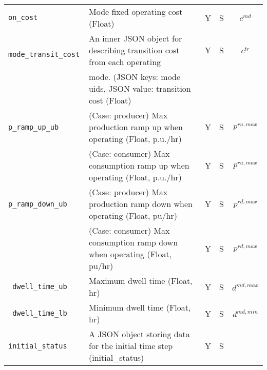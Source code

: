 \documentclass{article}
\begin{document}
\begin{center}
\begin{tabular}{ l | l | c | c | c |}
  {\tt on\_cost} & Mode fixed operating cost (Float) & Y & S & $c^{md}$\\
  {\tt\color{red} mode\_transit\_cost} & An inner JSON object for describing transition cost from each operating  & Y & S & $c^{tr}$ \\
     & mode. (JSON keys: mode uids, JSON value: transition cost (Float) &  &  &  \\
  {\tt p\_ramp\_up\_ub}     & {(Case: producer) Max production ramp up when operating (Float, p.u./hr)} & Y & S & $p^{ru,max}$ \\
                            & {(Case: consumer) Max consumption ramp up when operating (Float, p.u./hr)} & Y & S & $p^{ru,max}$ \\
  {\tt p\_ramp\_down\_ub}   & {(Case: producer) Max production ramp down when operating (Float, pu/hr)} & Y & S & $p^{rd,max}$ \\
                            & {(Case: consumer) Max consumption ramp down when operating (Float, pu/hr)} & Y & S & $p^{rd,max}$ \\
  {\tt\color{red} dwell\_time\_ub}          & Maximum dwell time (Float, hr) & Y & S &  $d^{md,max}$\\
  {\tt\color{red} dwell\_time\_lb}          & Minimum dwell time (Float, hr) & Y & S &  $d^{md,min}$\\
  {\tt initial\_status}          & A JSON object storing data for the initial time step (initial\_status) & Y & S &  \\
  \hline
\end{tabular}
\end{center}
\end{document}
